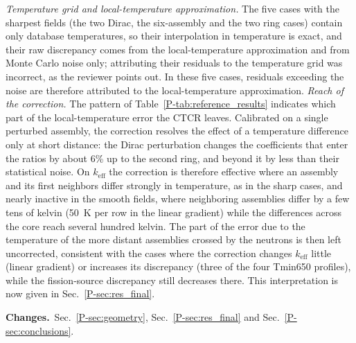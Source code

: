 \documentclass[11pt]{article}
\newcommand{\changes}{\par\noindent\textbf{Changes.}\ }
\begin{document}
\emph{Temperature grid and local-temperature approximation.} The five cases with the sharpest fields (the two Dirac, the six-assembly and the two ring cases) contain only database temperatures, so their interpolation in temperature is exact, and their raw discrepancy comes from the local-temperature approximation and from Monte Carlo noise only; attributing their residuals to the temperature grid was incorrect, as the reviewer points out. In these five cases, residuals exceeding the noise are therefore attributed to the local-temperature approximation.
\emph{Reach of the correction.} The pattern of Table~\ref{P-tab:reference_results} indicates which part of the local-temperature error the CTCR leaves. Calibrated on a single perturbed assembly, the correction resolves the effect of a temperature difference only at short distance: the Dirac perturbation changes the coefficients that enter the ratios by about 6\% up to the second ring, and beyond it by less than their statistical noise. On $k_{\text{eff}}$ the correction is therefore effective where an assembly and its first neighbors differ strongly in temperature, as in the sharp cases, and nearly inactive in the smooth fields, where neighboring assemblies differ by a few tens of kelvin (50~K per row in the linear gradient) while the differences across the core reach several hundred kelvin. The part of the error due to the temperature of the more distant assemblies crossed by the neutrons is then left uncorrected, consistent with the cases where the correction changes $k_{\text{eff}}$ little (linear gradient) or increases its discrepancy (three of the four Tmin650 profiles), while the fission-source discrepancy still decreases there. This interpretation is now given in Sec.~\ref{P-sec:res_final}.
\changes Sec.~\ref{P-sec:geometry}, Sec.~\ref{P-sec:res_final} and Sec.~\ref{P-sec:conclusions}.
\end{document}
